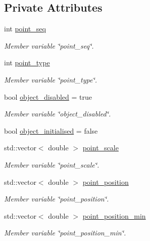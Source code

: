 \subsection*{Private Attributes}
\begin{DoxyCompactItemize}
\item 
int \mbox{\hyperlink{classPoint_ad33c4b30332e7e58264b35986ca5a387}{point\+\_\+seq}}
\begin{DoxyCompactList}\small\item\em Member variable \char`\"{}point\+\_\+seq\char`\"{}. \end{DoxyCompactList}\item 
int \mbox{\hyperlink{classPoint_aa672daab7c7949e840dfe79980d162b5}{point\+\_\+type}}
\begin{DoxyCompactList}\small\item\em Member variable \char`\"{}point\+\_\+type\char`\"{}. \end{DoxyCompactList}\item 
bool \mbox{\hyperlink{classPoint_a8767bfc9390f3089ebeb69f84293f816}{object\+\_\+disabled}} = true
\begin{DoxyCompactList}\small\item\em Member variable \char`\"{}object\+\_\+disabled\char`\"{}. \end{DoxyCompactList}\item 
bool \mbox{\hyperlink{classPoint_af2120c639f62adcd53844fc1ced96de4}{object\+\_\+initialised}} = false
\item 
std\+::vector$<$ double $>$ \mbox{\hyperlink{classPoint_a087b62626654e6fabae0bdb483d03be9}{point\+\_\+scale}}
\begin{DoxyCompactList}\small\item\em Member variable \char`\"{}point\+\_\+scale\char`\"{}. \end{DoxyCompactList}\item 
std\+::vector$<$ double $>$ \mbox{\hyperlink{classPoint_ad0fe25e84155d95663b00791ff9983fa}{point\+\_\+position}}
\begin{DoxyCompactList}\small\item\em Member variable \char`\"{}point\+\_\+position\char`\"{}. \end{DoxyCompactList}\item 
std\+::vector$<$ double $>$ \mbox{\hyperlink{classPoint_a2a1a9dcad0d1ef163b3ff0f35de8ddb4}{point\+\_\+position\+\_\+min}}
\begin{DoxyCompactList}\small\item\em Member variable \char`\"{}point\+\_\+position\+\_\+min\char`\"{}. \end{DoxyCompactList}\item 

\end{DoxyCompactItemize}
